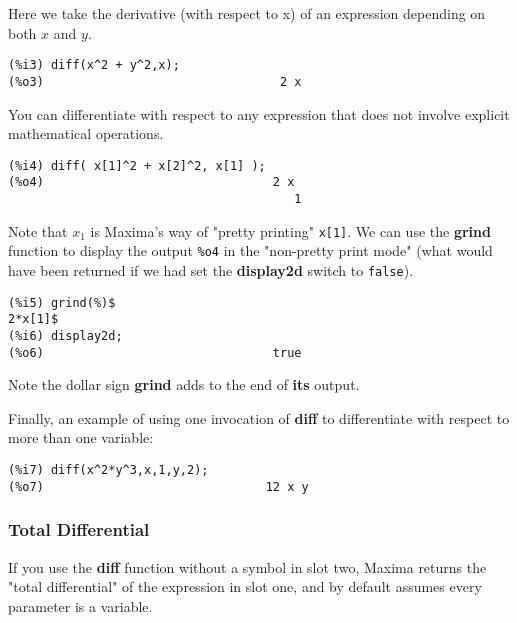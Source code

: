 \documentclass[12pt]{article}
\begin{document}
Here we take the derivative (with respect to x) of an expression
  depending on both $x$ and $y$.
\small
\begin{verbatim}
(%i3) diff(x^2 + y^2,x);
(%o3)                                 2 x
\end{verbatim}
\normalsize

You can differentiate with respect to any expression that does not
  involve explicit mathematical operations.
\small
\begin{verbatim}
(%i4) diff( x[1]^2 + x[2]^2, x[1] );
(%o4)                                2 x
                                        1
\end{verbatim}
\normalsize
Note that $x_{1}$ is Maxima's way of "pretty printing" \verb|x[1]|.
We can use the \textbf{grind} function to display the output \verb|%o4|
  in the "non-pretty print mode" (what would have been returned if we
  had set the \textbf{display2d} switch to \verb|false|).
\small
\begin{verbatim}
(%i5) grind(%)$
2*x[1]$
(%i6) display2d;
(%o6)                                true
\end{verbatim}
\normalsize
Note the dollar sign \textbf{grind} adds to the end of \textbf{its} output.  

\smallskip
Finally, an example of using one invocation of \textbf{diff}  to differentiate 
  with respect to more than one variable:
\small
\begin{verbatim}
(%i7) diff(x^2*y^3,x,1,y,2);
(%o7)                               12 x y
\end{verbatim}
\normalsize

\subsubsection{Total Differential}
If you use the \textbf{diff} function without a symbol in slot two, Maxima returns the
  "total differential" of  the expression in slot one, and by default assumes every
  parameter is a variable.
\end{document}
